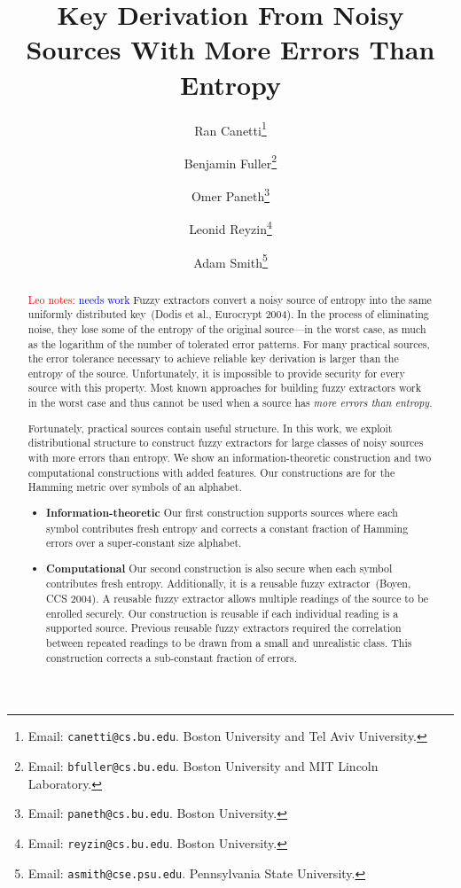 \documentclass[11pt]{article}
\title{Key Derivation From Noisy Sources With More Errors Than Entropy}
\author{Ran Canetti\footnote{Email: {\tt canetti@cs.bu.edu}. Boston University and Tel Aviv University.} \and Benjamin Fuller\footnote{Email: {\tt bfuller@cs.bu.edu}.  Boston University and MIT Lincoln Laboratory.} \and Omer Paneth\footnote{Email: {\tt paneth@cs.bu.edu}. Boston University.} \and Leonid Reyzin\footnote{Email: {\tt reyzin@cs.bu.edu}.  Boston University.} \and Adam Smith\footnote{Email: {\tt asmith@cse.psu.edu}.  Pennsylvania State University.} }
\newcommand{\authnote}[2]{{\textcolor{red}{\textsf{#1 notes: }\textcolor{blue}{ #2}}\marginpar{\textcolor{red}{\textbf{!!!!!}}}}}
\newcommand{\authnote}[2]{}
\newcommand{\lnote}[1]{{\authnote{Leo}{#1}}}
\begin{document}
\maketitle


\begin{abstract}
\lnote{needs work}
Fuzzy extractors convert a noisy source of entropy into the same uniformly distributed key~(Dodis et al., Eurocrypt 2004).  In the process of eliminating noise, they  lose some of the entropy of the original source---in the worst case, as much as the logarithm of the number of tolerated error patterns. For many practical sources, the error tolerance necessary to achieve reliable key derivation is larger than the entropy of the source.  Unfortunately, it is impossible to provide security for every source with this property.  Most known approaches for building fuzzy extractors work in the worst case and thus cannot be used when a source has \emph{more errors than entropy}.

Fortunately, practical sources contain useful structure.  In this work, we exploit distributional structure to construct fuzzy extractors for large classes of noisy sources with more errors than entropy.  
We show an information-theoretic construction and two computational constructions with added features.  Our constructions are for the Hamming metric over symbols of an alphabet.

\begin{itemize} \item \textbf{Information-theoretic}  Our first construction supports sources where each symbol contributes fresh entropy and corrects a constant fraction of Hamming errors over a super-constant size alphabet.  

\item \textbf{Computational}
Our second construction is also secure when each symbol contributes fresh entropy.  
Additionally, it is a reusable fuzzy extractor~(Boyen, CCS 2004).  A reusable fuzzy extractor allows multiple readings of the source to be enrolled securely.  Our construction is reusable if each individual reading is a supported source.  Previous reusable fuzzy extractors required the correlation between repeated readings to be drawn from a small and unrealistic class.  This construction corrects a sub-constant fraction of errors.  %


\end{itemize}
\end{abstract}
\end{document}

